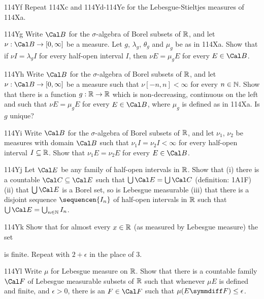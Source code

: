 {\spheader 114Yf Repeat 114Xc and 114Yd-114Ye for the
Lebesgue-Stieltjes measures of 114Xa.

\spheader 114Yg Write $\Cal B$ for the $\sigma$-algebra of Borel
subsets of
$\Bbb R$, and let $\nu:\Cal B\to[0,\infty]$ be a measure.   Let
$g$, $\lambda_g$, $\theta_g$ and $\mu_g$ be as in 114Xa.   Show that if
$\nu I=\lambda_gI$ for every half-open interval $I$, then $\nu E=\mu_gE$
for every $E\in\Cal B$.   

\spheader 114Yh Write $\Cal B$ for the $\sigma$-algebra of Borel
subsets of
$\Bbb R$, and let $\nu:\Cal B\to[0,\infty]$ be a measure such that
$\nu[-n,n]<\infty$ for every $n\in\Bbb N$.   Show that there is a
function $g:\Bbb R\to\Bbb R$ which is non-decreasing, continuous on the
left and
such that $\nu E=\mu_gE$ for every $E\in\Cal B$, where $\mu_g$ is
defined as in 114Xa.   Is $g$ unique?

\spheader 114Yi Write $\Cal B$ for the $\sigma$-algebra of Borel
subsets of
$\Bbb R$, and let $\nu_1$, $\nu_2$ be measures with domain $\Cal B$ such
that $\nu_1 I=\nu_2I<\infty$ for every half-open interval
$I\subseteq\Bbb R$.     Show that $\nu_1E=\nu_2E$ for every $E\in\Cal
B$.

\spheader 114Yj Let $\Cal E$ be any family of half-open
intervals in $\Bbb R$.   Show that (i) there is a countable
$\Cal C\subseteq\Cal E$ such that $\bigcup\Cal E=\bigcup\Cal C$
(definition:
1A1F) (ii) that $\bigcup\Cal E$ is a Borel set, so is Lebesgue
measurable (iii) that there is a disjoint sequence $\sequencen{I_n}$ of
half-open intervals in $\Bbb R$ such that $\bigcup\Cal
E=\bigcup_{n\in\Bbb N}I_n$.

\spheader 114Yk Show that for almost every $x\in\Bbb R$ (as measured by
Lebesgue measure) the set


\noindent is finite.      Repeat with $2+\epsilon$ in the place of $3$.

\spheader 114Yl Write $\mu$ for Lebesgue measure on $\Bbb R$.   Show that
there is a countable family $\Cal F$ of Lebesgue measurable subsets of
$\Bbb R$ such that whenever $\mu E$ is defined and finite, and
$\epsilon>0$, there is an $F\in\Cal F$ such that
$\mu(E\symmdiff F)\le\epsilon$.   
}%

